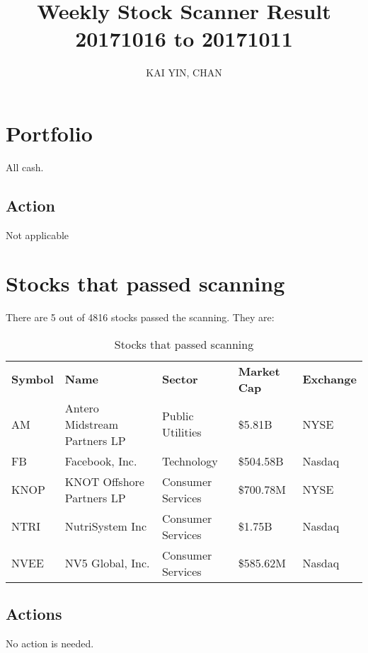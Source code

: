 \documentclass{article}
\begin{document}
\title{Weekly Stock Scanner Result \\ 20171016 to 20171011}
\author{KAI YIN, CHAN}
\maketitle

\section{Portfolio}
All cash.

\subsection{Action}
Not applicable

\section{Stocks that passed scanning}

There are 5 out of 4816 stocks passed the scanning.  They are:
\begin{table}[htbp]
  \caption{Stocks that passed scanning}
    \begin{tabular}{lllll}
    \textbf{Symbol} & \textbf{Name} & \textbf{Sector} & \textbf{Market Cap} & \textbf{Exchange} \\
    AM    & Antero Midstream Partners LP & Public Utilities & \$5.81B & NYSE \\
    FB    & Facebook, Inc. & Technology & \$504.58B & Nasdaq \\
    KNOP  & KNOT Offshore Partners LP & Consumer Services & \$700.78M & NYSE \\
    NTRI  & NutriSystem Inc & Consumer Services & \$1.75B & Nasdaq \\
    NVEE  & NV5 Global, Inc. & Consumer Services & \$585.62M & Nasdaq \\
    \end{tabular}%
  \label{tab:addlabel}%
\end{table}%

\subsection{Actions}
No action is needed. 
\end{document}
